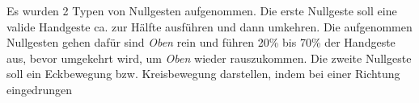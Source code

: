 Es wurden 2 Typen von Nullgesten aufgenommen. Die erste Nullgeste soll eine valide Handgeste ca. zur Hälfte ausführen und dann umkehren. Die aufgenommen Nullgesten gehen dafür sind \textit{Oben} rein und führen
20\% bis 70\% der Handgeste aus, bevor umgekehrt wird, um \textit{Oben} wieder rauszukommen. Die zweite Nullgeste soll ein Eckbewegung bzw. Kreisbewegung darstellen, indem bei einer Richtung eingedrungen
